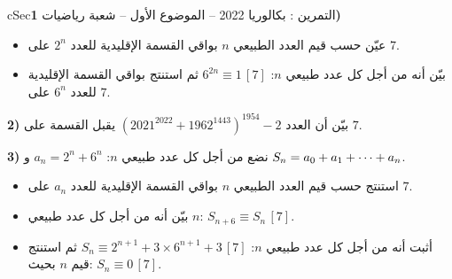 \documentclass[12pt,a4paper]{article}
\newenvironment{BOX}[2]{\begin{otherlanguage}{english}\begin{arbox}{#1}{#2}}{\end{arbox}\end{otherlanguage}}
\newcounter{exo}
\newenvironment{tamrin}[1]{\stepcounter{exo}\begin{BOX}{cSec}{التمرين \theexo: #1}}{\end{BOX}}
\renewcommand{\cdots}{\mathinner{\cdotp\cdotp\cdotp}}
\newenvironment{sq}{\begin{itemize}[leftmargin=2.4em,itemsep=3pt]}{\end{itemize}}
\newcommand{\qa}{\item[(أ)]}\newcommand{\qb}{\item[(ب)]}\newcommand{\qc}{\item[(جـ)]}\newcommand{\qd}{\item[(د)]}\newcommand{\qe}{\item[(هـ)]}
\begin{document}
\begin{tamrin}{بكالوريا 2022 -- الموضوع الأول -- شعبة رياضيات}
\textbf{1)}
\begin{sq}
\qa عيّن حسب قيم العدد الطبيعي $n$ بواقي القسمة الإقليدية للعدد $2^n$ على $7$.
\qb بيّن أنه من أجل كل عدد طبيعي $n$: $6^{2n}\equiv1\,[7]$ ثم استنتج بواقي القسمة الإقليدية للعدد $6^n$ على $7$.
\end{sq}
\textbf{2)} بيّن أن العدد $\left(2021^{2022}+1962^{1443}\right)^{1954}-2$ يقبل القسمة على $7$.

\textbf{3)} نضع من أجل كل عدد طبيعي $n$: $a_n=2^n+6^n$ و $S_n=a_0+a_1+\cdots+a_n$.
\begin{sq}
\qa استنتج حسب قيم العدد الطبيعي $n$ بواقي القسمة الإقليدية للعدد $a_n$ على $7$.
\qb بيّن أنه من أجل كل عدد طبيعي $n$: $S_{n+6}\equiv S_n\,[7]$.
\qc أثبت أنه من أجل كل عدد طبيعي $n$: $S_n\equiv2^{n+1}+3\times6^{n+1}+3\,[7]$ ثم استنتج قيم $n$ بحيث: $S_n\equiv0\,[7]$.
\end{sq}
\end{tamrin}
\end{document}
